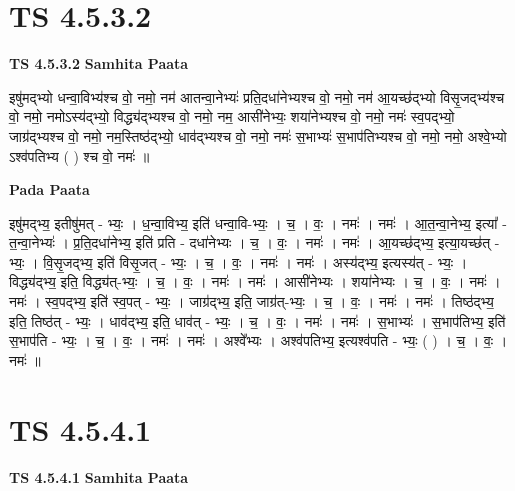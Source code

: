 \documentclass[17pt]{extarticle}
\begin{document}

\section{ TS 4.5.3.2 }

\textbf{TS 4.5.3.2 } \newline
\textbf{Samhita Paata} \newline

इषु॑मद्भ्यो धन्वा॒विभ्य॑श्च वो॒ नमो॒                  नम॑ आतन्वा॒नेभ्यः॑ प्रति॒दधा॑नेभ्यश्च वो॒ नमो॒                                     नम॑ आ॒यच्छ॑द्भ्यो विसृ॒जद्भ्य॑श्च वो॒ नमो॒   नमोऽस्य॑द्भ्यो॒ विद्ध्य॑द्भ्यश्च वो॒ नमो॒                नम॒ आसी॑नेभ्यः॒ शया॑नेभ्यश्च वो॒ नमो॒                                               नमः॑ स्व॒पद्भ्यो॒ जाग्र॑द्भ्यश्च वो॒ नमो॒                                              नम॒स्तिष्ठ॑द्भ्यो॒ धाव॑द्भ्यश्च वो॒ नमो॒     नमः॑ स॒भाभ्यः॑ स॒भाप॑तिभ्यश्च वो॒ नमो॒                                            नमो॒ अश्वे॒भ्यो ऽश्व॑पतिभ्य ( ) श्च वो॒ नमः॑ ॥ \newline

\textbf{Pada Paata} \newline

इषु॑मद्भ्य॒ इतीषु॑मत् - भ्यः॒ । ध॒न्वा॒विभ्य॒ इति॑ धन्वा॒वि-भ्यः॒ । च॒ । वः॒ । नमः॑ । नमः॑ । आ॒त॒न्वा॒नेभ्य॒ इत्या᳚ - त॒न्वा॒नेभ्यः॑ । प्र॒ति॒दधा॑नेभ्य॒ इति॑ प्रति - दधा॑नेभ्यः । च॒ । वः॒ । नमः॑ । नमः॑ । आ॒यच्छ॑द्भ्य॒ इत्या॒यच्छ॑त् - भ्यः॒ । वि॒सृ॒जद्भ्य॒ इति॑ विसृ॒जत् - भ्यः॒ । च॒ । वः॒ । नमः॑ । नमः॑ । अस्य॑द्भ्य॒ इत्यस्य॑त् - भ्यः॒ । विद्ध्य॑द्भ्य॒ इति॒ विद्ध्य॑त्-भ्यः॒ । च॒ । वः॒ । नमः॑ । नमः॑ । आसी॑नेभ्यः । शया॑नेभ्यः । च॒ । वः॒ । नमः॑ । नमः॑ । स्व॒पद्भ्य॒ इति॑ स्व॒पत् - भ्यः॒ । जाग्र॑द्भ्य॒ इति॒ जाग्र॑त्-भ्यः॒ । च॒ । वः॒ । नमः॑ । नमः॑ । तिष्ठ॑द्भ्य॒ इति॒ तिष्ठ॑त् - भ्यः॒ । धाव॑द्भ्य॒ इति॒ धाव॑त् - भ्यः॒ । च॒ । वः॒ । नमः॑ । नमः॑ । स॒भाभ्यः॑ । स॒भाप॑तिभ्य॒ इति॑ स॒भाप॑ति - भ्यः॒ । च॒ । वः॒ । नमः॑ । नमः॑ । अश्वे᳚भ्यः । अश्व॑पतिभ्य॒ इत्यश्व॑पति - भ्यः॒ ( ) । च॒ । वः॒ । नमः॑ ॥  \newline





\section{ TS 4.5.4.1 }

\textbf{TS 4.5.4.1 } \newline
\textbf{Samhita Paata} \newline
\end{document}
